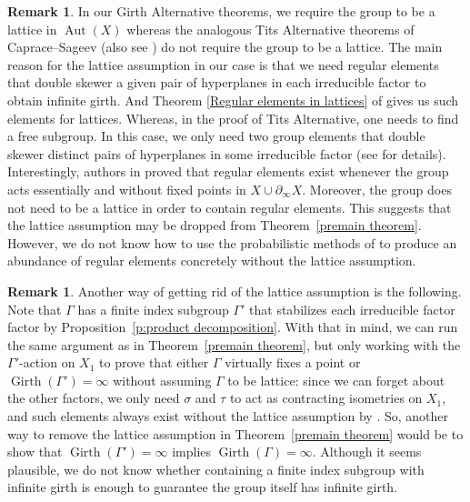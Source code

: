 \documentclass{amsart}
\theoremstyle{definition}
\newtheorem{remark}[theorem]{Remark}
\newtheorem*{Notation warning}{Warning on notations}
\newtheorem*{Sketch of proof}{Sketch of proof for Theorem C}
\DeclareMathOperator{\Gir}{Girth}
\def\aut{\mathop{\mathrm{Aut}}\nolimits}
\begin{document}
\begin{sloppypar}
\begin{remark}\label{lattice vs non-lattice}
In our Girth Alternative theorems, we require the group to be a lattice in $\aut(X)$ whereas the analogous Tits Alternative theorems of Caprace--Sageev \cite{Caprace_2011} (also see \cite{sageev_wise_2005}) do not require the group to be a lattice. 
The main reason for the lattice assumption in our case is that we need regular elements that double skewer a given pair of hyperplanes in each irreducible factor to obtain infinite girth. 
And Theorem \ref{Regular elements in lattices} of \cite{Caprace_2011} gives us such elements for lattices.
Whereas, in the proof of Tits Alternative, one needs to find a free subgroup.  
In this case, we only need two group elements that double skewer distinct pairs of hyperplanes in some irreducible factor (see \cite{Caprace_2011} for details).
Interestingly, authors in \cite[Theorem 1.5]{Fernos2016Random} proved that regular elements exist whenever the group acts essentially and without fixed points in $X\cup\partial_\infty X$. Moreover, the group does not need to be a lattice in order to contain regular elements. 
This suggests that the lattice assumption may be dropped from Theorem~\ref{premain theorem}.
 However, we do not know how to use the probabilistic methods of \cite{Fernos2016Random} to produce an abundance of regular elements concretely without the lattice assumption.
\end{remark}

\begin{remark}\label{lattice vs non-lattice2}
    Another way of getting rid of the lattice assumption is the following. Note that $\Gamma$ has a finite index subgroup $\Gamma'$ that stabilizes each irreducible factor factor by Proposition~\ref{p:product decomposition}. With that in mind, we can run the same argument as in Theorem~\ref{premain theorem}, but only working with the $\Gamma'$-action on $X_1$ to prove that either $\Gamma$ virtually fixes a point or $\Gir(\Gamma')=\infty$ without assuming $\Gamma$ to be lattice: since we can forget about the other factors, we only need $\sigma$ and $\tau$ to act as contracting isometries on $X_1$, and such elements always exist without the lattice assumption by \cite{Caprace_2011}.
    So, another way to remove the lattice assumption in Theorem~\ref{premain theorem} would be to show that  $\Gir(\Gamma')=\infty$ implies $\Gir(\Gamma)=\infty$. 
     Although it seems plausible, we do not know whether containing a finite index subgroup with infinite girth is enough to guarantee the group itself has infinite girth.
\end{remark}


\end{sloppypar}
\end{document}
